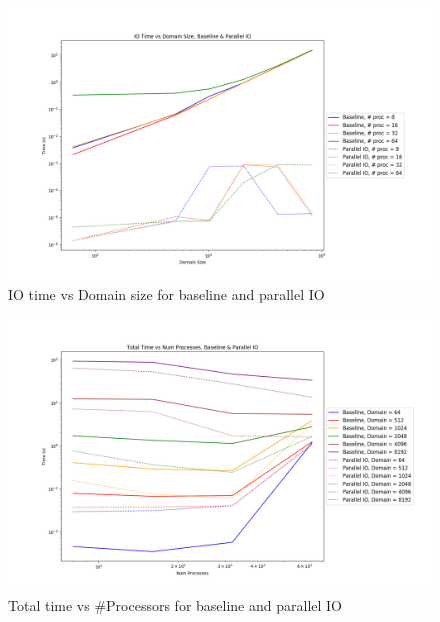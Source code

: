 \begin{enumerate}
 
 \begin{figure}[p] %
  \begin{center}
    \includegraphics[width=.9\linewidth]{Figures/io/io_multproc_haswell_io_baseline.png} %
    \caption{IO time vs Domain size for baseline and parallel IO}
    \label{fig:par_io_io_vs_domain}
  \end{center}
\end{figure}
 

 \begin{figure}[p] %
   \begin{center}
     \includegraphics[width=.9\linewidth]{Figures/io/total_multdomain_haswell_io_baseline.png} %
     \caption{Total time vs \#Processors for baseline and parallel IO}
     \label{fig:par_io_total_vs_proc}
   \end{center}
 \end{figure}


\end{enumerate}
